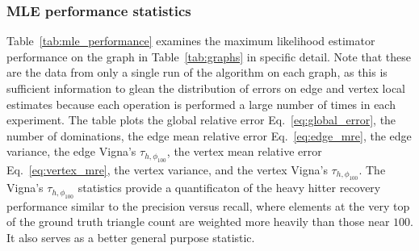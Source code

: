 \documentclass[10]{report}
\begin{document}
\subsubsection{MLE performance statistics}

Table~\ref{tab:mle_performance} examines the maximum likelihood estimator performance on the graph in Table~\ref{tab:graphs} in specific detail. 
Note that these are the data from only a single run of the algorithm on each graph, as this is sufficient information to glean the distribution of errors on edge and vertex local estimates because each operation is performed a large number of times in each experiment.
The table plots the global relative error Eq.~\eqref{eq:global_error}, the number of dominations, the edge mean relative error Eq.~\eqref{eq:edge_mre}, the edge variance, the edge Vigna's $\tau_{h, \phi_{100}}$, the vertex mean relative error Eq.~\eqref{eq:vertex_mre}, the vertex variance, and the vertex Vigna's $\tau_{h, \phi_{100}}$.
The Vigna's $\tau_{h, \phi_{100}}$ statistics provide a quantificaton of the heavy hitter recovery performance similar to the precision versus recall, where elements at the very top of the ground truth triangle count are weighted more heavily than those near $100$.
It also serves as a better general purpose statistic. 
\end{document}
